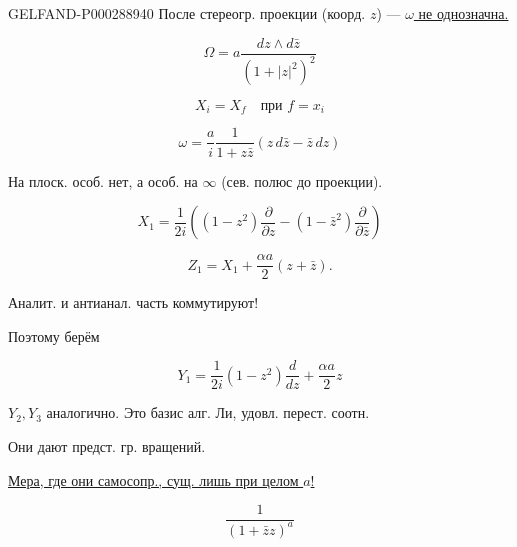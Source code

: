 \begin{GelfandAdjacentEvidence}{GELFAND-P000288}{940}
После стереогр. проекции (коорд. $z$) --- \underline{$\omega$ не однозначна.}





\begin{equation*}\Omega=a\frac{dz\wedge d\bar z}{(1+|z|^2)^2}\end{equation*}

\begin{equation*}X_i=X_f\quad\text{при }f=x_i\end{equation*}

\begin{equation*}\omega=\frac{a}{i}\frac{1}{1+z\bar z}(z\,d\bar z-\bar z\,dz)\end{equation*}

\end{GelfandAdjacentEvidence}


На плоск. особ. нет, а особ. на $\infty$ (сев. полюс до проекции).

\begin{equation*}X_1=\frac{1}{2i}\left((1-z^2)\frac{\partial}{\partial z}-(1-\bar z^2)\frac{\partial}{\partial\bar z}\right)\end{equation*}

\begin{equation*}Z_1=X_1+\frac{\alpha a}{2}(z+\bar z).\end{equation*}

Аналит. и антианал. часть коммутируют!

Поэтому берём

\begin{equation*}Y_1=\frac{1}{2i}(1-z^2)\frac{d}{dz}+\frac{\alpha a}{2}z\end{equation*}

$Y_2,Y_3$ аналогично. Это базис алг. Ли, удовл. перест. соотн.



Они дают предст. гр. вращений.

\underline{Мера, где они самосопр., сущ. лишь при целом $a$!}

\begin{equation*}\frac{1}{(1+\bar z z)^a}\end{equation*}

